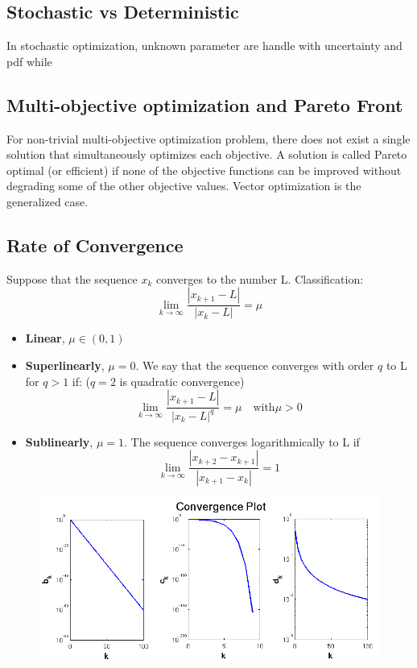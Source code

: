 \documentclass[twocolumn]{article}
\numberwithin{equation}{section}
\begin{document}
	\subsection{Stochastic vs Deterministic}
In stochastic optimization, unknown parameter are handle with uncertainty and pdf while 


	

	\subsection{Multi-objective optimization and Pareto Front}
For non-trivial multi-objective optimization problem, there does not exist a single solution that simultaneously optimizes each objective. A solution is called Pareto optimal (or efficient) if none of the objective functions can be improved without degrading some of the other objective values. Vector optimization is the generalized case.


	\subsection{Rate of Convergence} \label{subsec:rateofconvergence}
Suppose that the sequence ${x_k}$ converges to the number L. Classification:
$$\lim_{k\to \infty} \frac{|x_{k+1}-L|}{|x_k-L|} = \mu$$
\begin{itemize}
	\item \textbf{Linear}, $\mu \in (0, 1)$
	\item \textbf{Superlinearly}, $\mu=0$. We say that the sequence converges with order $q$ to L for $q>1$ if: ($q = 2$ is quadratic convergence)
	$$ \lim_{k\to \infty} \frac{|x_{k+1}-L|}{|x_k-L|^q} = \mu \quad  \text{with} \mu > 0$$
	\item \textbf{Sublinearly}, $\mu=1$. The sequence converges logarithmically to L if 
	$$ \lim_{k\to \infty} \frac{|x_{k+2} - x_{k+1}|}{|x_{k+1} - x_k|} = 1$$
\end{itemize}
\begin{figure}[H]
	\centering
    \includegraphics[width=.40\textwidth]{ConvergencePlots.png}
\end{figure}
\end{document}
